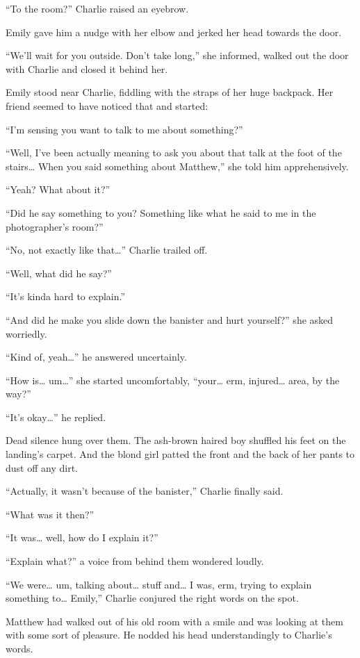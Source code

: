 “To the room?” Charlie raised an eyebrow.

Emily gave him a nudge with her elbow and jerked her head towards the door.

“We'll wait for you outside. Don't take long,” she informed, walked out the door with Charlie and closed it behind her.

\bigskip

Emily stood near Charlie, fiddling with the straps of her huge backpack. Her friend seemed to have noticed that and started:

“I'm sensing you want to talk to me about something?”

“Well, I've been actually meaning to ask you about that talk at the foot of the stairs… When you said something about Matthew,” she told him apprehensively.

“Yeah? What about it?”

“Did he say something to you? Something like what he said to me in the photographer's room?”

“No, not exactly like that…” Charlie trailed off.

“Well, what did he say?”

“It's kinda hard to explain.”

“And did he make you slide down the banister and hurt yourself?” she asked worriedly.

“Kind of, yeah…” he answered uncertainly.

“How is… um…” she started uncomfortably, “your… erm, injured… area, by the way?”

“It's okay…” he replied.

Dead silence hung over them. The ash-brown haired boy shuffled his feet on the landing's carpet. And the blond girl patted the front and the back of her pants to dust off any dirt.

“Actually, it wasn't because of the banister,” Charlie finally said.

“What was it then?”

“It was… well, how do I explain it?”

“Explain what?” a voice from behind them wondered loudly.

“We were… um, talking about… stuff and… I was, erm, trying to explain something to… Emily,” Charlie conjured the right words on the spot.

Matthew had walked out of his old room with a smile and was looking at them with some sort of pleasure. He nodded his head understandingly to Charlie's words.

